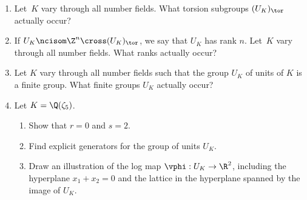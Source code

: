 \begin{enumerate}
\item Let~$K$ vary through all number fields.  What torsion
subgroups $(U_K)_{\tor}$ actually occur?

\item If 
$U_K \ncisom \Z^n \cross (U_K)_{\tor}$, we say that $U_K$
has rank $n$.  Let~$K$ vary through all number fields.  
What ranks actually occur?

\item Let $K$ vary through all number fields such that the
group $U_K$ of units of $K$ is a finite group.  What finite groups
$U_K$ actually occur?

\item Let $K=\Q(\zeta_5)$.
\begin{enumerate}
\item Show that $r=0$ and $s=2$.
\item Find explicit generators for the group of
units $U_K$.
\item Draw an illustration of the log map
$\vphi:U_K\to \R^2$, including the hyperplane
$x_1+x_2=0$ and the lattice in the hyperplane 
spanned by the image of $U_K$.
\end{enumerate}










\end{enumerate}
